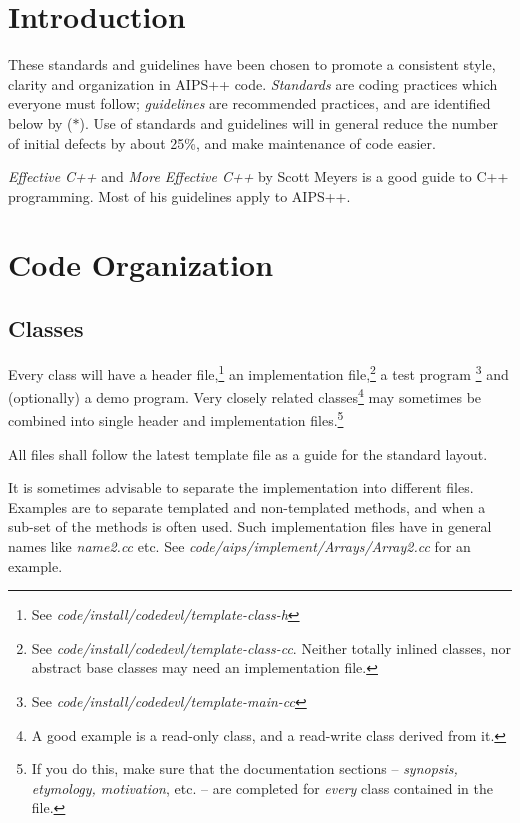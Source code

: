 \section {Introduction}
These standards and guidelines have been chosen to promote a consistent
style, clarity and organization in AIPS++ code.  {\em Standards} are coding
practices which everyone must follow; {\em guidelines} are recommended
practices, and are identified below by ($\ast$).
\bmar Use of standards and guidelines will in general reduce the number of
initial defects by about 25\%, and make maintenance of code easier.\bmar

{\it Effective C++} and {\it More Effective C++} \bmar 
by Scott Meyers is a good guide to C++ programming.  
Most of his guidelines apply to AIPS++. 
\section {Code Organization}
\subsection {Classes} Every class will have a header file,\footnote{See {\em
code/install/codedevl/template-class-h}} an implementation file,\footnote
{See {\em code/install/codedevl/template-class-cc}. Neither totally inlined
classes, nor abstract base classes may need an implementation file.} a test
program \footnote {See {\em code/install/codedevl/template-main-cc}} 
and (optionally) a demo program.  Very closely related classes\footnote {A
good example is a read-only class, and a read-write class derived from it.}
may sometimes be combined into single header and implementation
files.\footnote {If you do this, make sure that the documentation sections --
{\em synopsis, etymology, motivation}, etc. -- are completed for {\em every}
class contained in the file.}

\bmar All files shall follow the latest template file as a guide for the
standard layout.

It is sometimes advisable to separate the implementation into different
files. Examples are to separate templated and non-templated methods, and when
a sub-set of the methods is often used. Such implementation files have in
general names like {\it name2.cc} etc. See {\it
code/aips/implement/Arrays/Array2.cc} for an example.

